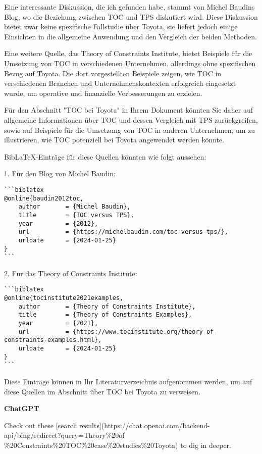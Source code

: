 Eine interessante Diskussion, die ich gefunden habe, stammt von Michel Baudins Blog, wo die Beziehung zwischen TOC und TPS diskutiert wird. Diese Diskussion bietet zwar keine spezifische Fallstudie über Toyota, sie liefert jedoch einige Einsichten in die allgemeine Anwendung und den Vergleich der beiden Methoden.

Eine weitere Quelle, das Theory of Constraints Institute, bietet Beispiele für die Umsetzung von TOC in verschiedenen Unternehmen, allerdings ohne spezifischen Bezug auf Toyota. Die dort vorgestellten Beispiele zeigen, wie TOC in verschiedenen Branchen und Unternehmenskontexten erfolgreich eingesetzt wurde, um operative und finanzielle Verbesserungen zu erzielen.

Für den Abschnitt "TOC bei Toyota" in Ihrem Dokument könnten Sie daher auf allgemeine Informationen über TOC und dessen Vergleich mit TPS zurückgreifen, sowie auf Beispiele für die Umsetzung von TOC in anderen Unternehmen, um zu illustrieren, wie TOC potenziell bei Toyota angewendet werden könnte.

BibLaTeX-Einträge für diese Quellen könnten wie folgt aussehen:

1. Für den Blog von Michel Baudin:

\begin{verbatim}
```biblatex
@online{baudin2012toc,
	author       = {Michel Baudin},
	title        = {TOC versus TPS},
	year         = {2012},
	url          = {https://michelbaudin.com/toc-versus-tps/},
	urldate      = {2024-01-25}
}
```
\end{verbatim}

2. Für das Theory of Constraints Institute:

\begin{verbatim}
```biblatex
@online{tocinstitute2021examples,
	author       = {Theory of Constraints Institute},
	title        = {Theory of Constraints Examples},
	year         = {2021},
	url          = {https://www.tocinstitute.org/theory-of-constraints-examples.html},
	urldate      = {2024-01-25}
}
```
\end{verbatim}

Diese Einträge können in Ihr Literaturverzeichnis aufgenommen werden, um auf diese Quellen im Abschnitt über TOC bei Toyota zu verweisen.

\textbf{ChatGPT}

Check out these [search results](https://chat.openai.com/backend-api/bing/redirect?query=Theory\%20of \\
\%20Constraints\%20TOC\%20case\%20studies\%20Toyota) to dig in deeper.

